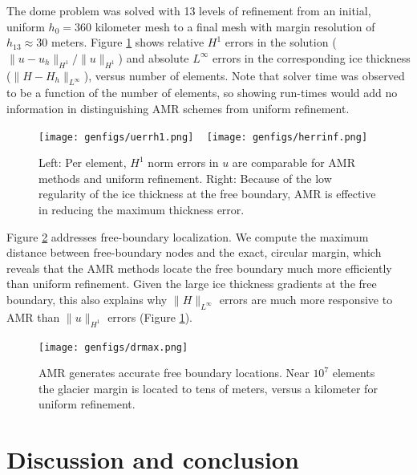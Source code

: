\documentclass[]{interact}
\theoremstyle{plain}%
\theoremstyle{definition}
\theoremstyle{remark}
\begin{document}

The dome problem was solved with 13 levels of refinement from an initial, uniform $h_0=360$ kilometer mesh to a final mesh with margin resolution of $h_{13}\approx 30$ meters.  Figure \ref{fig:domenormresults} shows relative $H^1$ errors in the solution ($\|u-u_h\|_{H^1}/\|u\|_{H^1}$) and absolute $L^\infty$ errors in the corresponding ice thickness ($\|H-H_h\|_{L^\infty}$), versus number of elements.  Note that solver time was observed to be a function of the number of elements, so showing run-times would add no information in distinguishing AMR schemes from uniform refinement.

\begin{figure}[ht]
\noindent\mbox{\texttt{[image: genfigs/uerrh1.png]} \, \texttt{[image: genfigs/herrinf.png]}}
\caption{Left: Per element, $H^1$ norm errors in $u$ are comparable for AMR methods and uniform refinement.  Right: Because of the low regularity of the ice thickness at the free boundary, AMR is effective in reducing the maximum thickness error.}
\label{fig:domenormresults}
\end{figure}

Figure \ref{fig:domeradiusresults} addresses free-boundary localization.  We compute the maximum distance between free-boundary nodes and the exact, circular margin, which reveals that the AMR methods locate the free boundary much more efficiently than uniform refinement.  Given the large ice thickness gradients at the free boundary, this also explains why $\|H\|_{L^\infty}$ errors are much more responsive to AMR than $\|u\|_{H^1}$ errors (Figure \ref{fig:domenormresults}).

\begin{figure}[ht]
\centering
\texttt{[image: genfigs/drmax.png]}
\caption{AMR generates accurate free boundary locations.  Near $10^7$ elements the glacier margin is located to tens of meters, versus a kilometer for uniform refinement.}
\label{fig:domeradiusresults}
\end{figure}


\section{Discussion and conclusion} \label{sec:conclusion}
\end{document}
